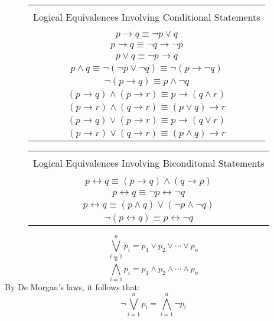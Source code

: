 \documentclass[article, 11pt]{article}
\theoremstyle{definition}
\newcommand{\lra}{\leftrightarrow} %
\begin{document}
    \begin{figure}[H]
        \centering
        {\setlength{\tabcolsep}{2em}
        \begin{tabular}{|c|}
            \hline
            \\
            Logical Equivalences Involving Conditional Statements \\
            \\
            \hline
            $p \to q \equiv \neg p \lor q$ \\
            $p \to q \equiv \neg q \to \neg p$ \\
            $p \lor q \equiv \neg p \to q$ \\
            $p \land q \equiv \neg (\neg p \lor \neg q) \equiv \neg (p \to \neg q)$ \\
            $\neg(p \to q) \equiv p \land \neg q$ \\
            $(p \to q) \land (p \to r) \equiv p \to (q \land r) $ \\
            $(p \to r) \land (q \to r) \equiv (p \lor q) \to r$ \\
            $(p \to q) \lor (p \to r) \equiv p \to (q \lor r)$ \\
            $(p \to r) \lor (q \to r) \equiv (p \land q) \to r$ \\
            \hline
        \end{tabular}}
    \end{figure}
    \begin{figure}[H]
        \centering
        {\setlength{\tabcolsep}{2em}
        \begin{tabular}{|c|}
            \hline
            \\
            Logical Equivalences Involving Biconditonal Statements \\
            \\
            \hline
            $p \lra q \equiv (p \to q) \land (q \to p)$ \\
            $p \lra q \equiv \neg p \lra \neg q$ \\
            $p \lra q \equiv (p \land q) \lor (\neg p \land \neg q)$ \\
            $\neg(p \lra q) \equiv p \lra \neg q$ \\
            \hline
        \end{tabular}}
    \end{figure}
    \begin{equation*}
        \bigvee_{i=1}^n p_i = p_1 \lor p_2 \lor \cdots \lor p_n
    \end{equation*}
    \begin{equation*}
        \bigwedge_{i=1}^n p_i = p_1 \land p_2 \land \cdots \land p_n
    \end{equation*}
    By De Morgan's laws, it follows that:
    \begin{equation*}
        \neg \bigvee_{i=1}^n p_i = \bigwedge_{i=1}^n \neg p_i
    \end{equation*}
\end{document}
